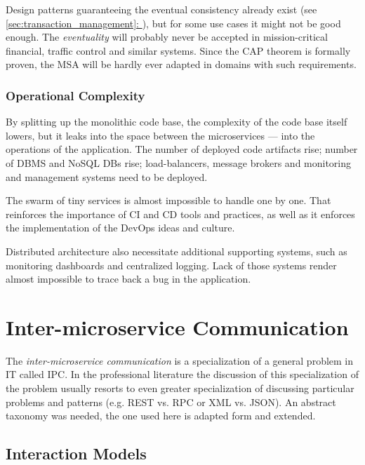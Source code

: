 \documentclass[thesis=M,english,hidelinks]{FITthesis}[2012/10/20]
\newcommand*{\fullref}[1]{\hyperref[{#1}]{\autoref*{#1}: \textit{\nameref*{#1}}}}
\begin{document}
Design patterns guaranteeing the eventual consistency already exist (see \fullref{sec:transaction_management}), but for some use cases it might not be good enough. The \textit{eventuality} will probably never be accepted in mission-critical financial, traffic control and similar systems. Since the \acrshort{CAP} theorem is formally proven, the \acrshort{MSA} will be hardly ever adapted in domains with such requirements.

\subsubsection{Operational Complexity}
By splitting up the monolithic code base, the complexity of the code base itself lowers, but it leaks into the space between the microservices --- into the operations of the application. The number of deployed code artifacts rise; number of \acrshort{DBMS} and NoSQL \acrshort{DB}s rise; load-balancers, message brokers and monitoring and management systems need to be deployed.

The swarm of tiny services is almost impossible to handle one by one. That reinforces the importance of \acrfull{CI} and \acrfull{CD} tools and practices, as well as it enforces the implementation of the DevOps ideas and culture.

Distributed architecture also necessitate additional supporting systems, such as monitoring dashboards and centralized logging. Lack of those systems render almost impossible to trace back a bug in the application.

% 
% 

\section{Inter-microservice Communication}
\label{sec:inter-service-communication}

The \textit{inter-microservice communication} is a specialization of a general problem in \acrshort{IT} called \acrfull{IPC}. In the professional literature the discussion of this specialization of the problem usually resorts to even greater specialization of discussing particular problems and patterns (e.g. \acrshort{REST} vs. \acrshort{RPC} or \acrshort{XML} vs. \acrshort{JSON}). An abstract taxonomy was needed, the one used here is adapted form \cite{ms-taxonomy} and extended.



\subsection{Interaction Models}
\end{document}
